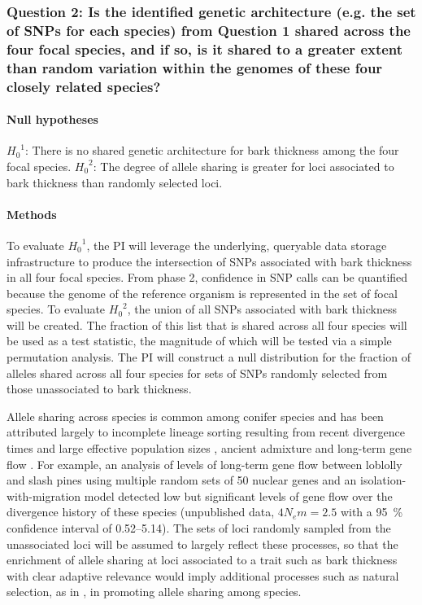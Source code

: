\subsubsection*{Question 2: Is the identified genetic architecture (e.g. the set of SNPs for each species) from Question 1 
shared across the four focal species, and if so, is it shared to a greater extent than random variation within the 
genomes of these four closely related species?}

\paragraph{Null hypotheses}  ${H_{0}}^1$: There is no shared genetic architecture for bark thickness among 
the four focal species. ${H_{0}}^2$: The degree of allele sharing is greater for loci associated to 
bark thickness than randomly selected loci.

\paragraph{Methods} To evaluate ${H_{0}}^1$, the PI will leverage the underlying, queryable data storage infrastructure 
to produce the intersection of SNPs associated with bark thickness in all four focal species.  From phase 2, confidence in SNP 
calls can be quantified because the genome of the reference organism is represented in the set of focal species.  
To evaluate ${H_{0}}^2$, the union of all SNPs associated with bark thickness 
will be created. The fraction of this list that is shared across all four species will be used as a test statistic, the magnitude 
of which will be tested via a simple permutation analysis. The PI will construct a null distribution for the fraction of alleles 
shared across all four species for sets of SNPs randomly selected from those unassociated to bark thickness. 

Allele sharing across species is common among conifer species and has been attributed largely to incomplete lineage 
sorting resulting from recent divergence times and large effective population sizes \citep{Syring:2007gd,Willyard:2009ez}, 
ancient admixture \citep{Liston:2007cx} and 
long-term gene flow \citep{Zhou:2010hk}. For example, an analysis of 
levels of long-term gene flow between loblolly and slash pines using multiple random sets of 50 nuclear genes and an 
isolation-with-migration model \citep{Becquet:2007js} detected low but significant levels of gene flow over the divergence history 
of these species (unpublished data, $4 N_{e}m = 2.5$ with a \SI{95}{\percent} confidence interval of 0.52--5.14). The sets of loci 
randomly sampled from the unassociated loci will be assumed to largely reflect these processes, so that the 
enrichment of allele sharing at loci associated to a trait such as bark thickness with clear adaptive relevance 
\citep{He:2012bz} would imply additional processes such as natural selection, as in \cite{Segurel:vf}, in promoting allele 
sharing among species.

